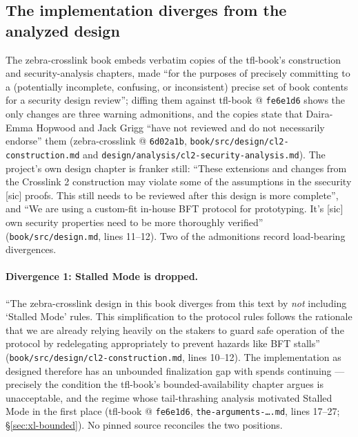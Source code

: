 \documentclass[11pt,a4paper]{article}
\theoremstyle{definition}
\begin{document}
\subsection{The implementation diverges from the analyzed design}
\label{sec:xl-impl-divergences}

The zebra-crosslink book embeds verbatim copies of the tfl-book's
construction and security-analysis chapters, made ``for the purposes of
precisely committing to a (potentially incomplete, confusing, or
inconsistent) precise set of book contents for a security design
review''; diffing them against tfl-book @ \texttt{fe6e1d6} shows the only
changes are three warning admonitions, and the copies state that
Daira-Emma Hopwood and Jack Grigg ``have not reviewed and do not
necessarily endorse'' them (zebra-crosslink @ \texttt{6d02a1b},
\texttt{book/src/design/cl2-construction.md} and
\texttt{design/analysis/cl2-security-analysis.md}). The project's own
design chapter is franker still: ``These extensions and changes from the
Crosslink 2 construction may violate some of the assumptions in the
ssecurity [sic] proofs. This still needs to be reviewed after this design
is more complete'', and ``We are using a custom-fit in-house BFT protocol
for prototyping. It's [sic] own security properties need to be more
thoroughly verified'' (\texttt{book/src/design.md}, lines 11--12). Two of
the
admonitions record load-bearing divergences.

\paragraph{Divergence 1: Stalled Mode is dropped.} ``The zebra-crosslink
design in this book diverges from this text by \emph{not} including
`Stalled Mode' rules. This simplification to the protocol rules follows
the rationale that we are already relying heavily on the stakers to guard
safe operation of the protocol by redelegating appropriately to prevent
hazards like BFT stalls'' (\texttt{book/src/design/cl2-construction.md},
lines 10--12). The implementation as designed therefore has an unbounded
finalization gap with spends continuing --- precisely the condition the
tfl-book's bounded-availability chapter argues is unacceptable, and the
regime whose tail-thrashing analysis motivated Stalled Mode in the first
place (tfl-book @ \texttt{fe6e1d6}, \texttt{the-arguments-\ldots.md},
lines 17--27; \S\ref{sec:xl-bounded}). No pinned source reconciles the two
positions.
\end{document}
